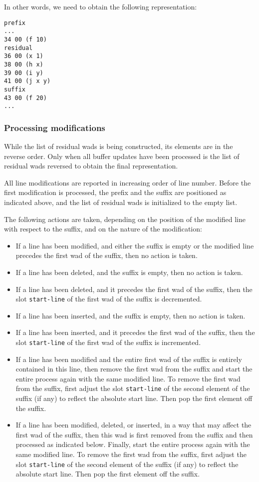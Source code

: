 In other words, we need to obtain the following representation:

\begin{verbatim}
prefix
...
34 00 (f 10)
residual
36 00 (x 1)
38 00 (h x)
39 00 (i y)
41 00 (j x y)
suffix
43 00 (f 20)
...
\end{verbatim}

\subsubsection{Processing modifications}

While the list of residual wads is being constructed, its
elements are in the reverse order.  Only when all buffer updates have
been processed is the list of residual wads reversed to
obtain the final representation.

All line modifications are reported in increasing order of line
number.  Before the first modification is processed, the prefix and
the suffix are positioned as indicated above, and the list of residual
wads is initialized to the empty list.

The following actions are taken, depending on the position of the
modified line with respect to the suffix, and on the nature of the
modification:

\begin{itemize}
\item If a line has been modified, and either the suffix is empty or
  the modified line precedes the first wad of the suffix,
  then no action is taken.
\item If a line has been deleted, and the suffix is empty, then no
  action is taken.
\item If a line has been deleted, and it precedes the first wad
  of the suffix, then the slot \texttt{start-line} of the first
  wad of the suffix is decremented.
\item If a line has been inserted, and the suffix is empty, then no
  action is taken.
\item If a line has been inserted, and it precedes the first wad
  of the suffix, then the slot \texttt{start-line} of the first
  wad of the suffix is incremented.
\item If a line has been modified and the entire first wad of
  the suffix is entirely contained in this line, then remove the first
  wad from the suffix and start the entire process again with
  the same modified line.  To remove the first wad from the
  suffix, first adjust the slot \texttt{start-line} of the second
  element of the suffix (if any) to reflect the absolute start line.
  Then pop the first element off the suffix.
\item If a line has been modified, deleted, or inserted, in a way that
  may affect the first wad of the suffix, then this wad
  is first removed from the suffix and then processed as
  indicated below.  Finally, start the entire process again with the
  same modified line.  To remove the first wad from the
  suffix, first adjust the slot \texttt{start-line} of the second
  element of the suffix (if any) to reflect the absolute start line.
  Then pop the first element off the suffix.
\end{itemize}

